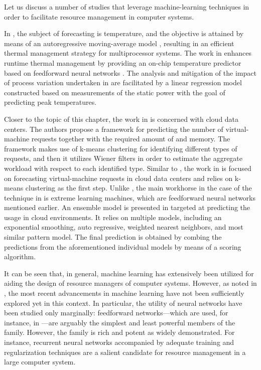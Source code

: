 Let us discuss a number of studies that leverage machine-learning techniques in
order to facilitate resource management in computer systems.

In \cite{coskun2008}, the subject of forecasting is temperature, and the
objective is attained by means of an autoregressive moving-average model
\cite{hastie2013}, resulting in an efficient thermal management strategy for
multiprocessor systems. The work in \cite{kumar2010} enhances runtime thermal
management by providing an on-chip temperature predictor based on feedforward
neural networks \cite{hastie2013}. The analysis and mitigation of the impact of
process variation undertaken in \cite{juan2014} are facilitated by a linear
regression model \cite{hastie2013} constructed based on measurements of the
static power with the goal of predicting peak temperatures.

Closer to the topic of this chapter, the work in \cite{dabbagh2015} is concerned
with cloud data centers. The authors propose a framework for predicting the
number of virtual-machine requests together with the required amount of 
and memory. The framework makes use of k-means clustering \cite{hastie2013} for
identifying different types of requests, and then it utilizes Wiener filters in
order to estimate the aggregate workload with respect to each identified type.
Similar to \cite{dabbagh2015}, the work in \cite{ismaeel2015} is focused on
forecasting virtual-machine requests in cloud data centers and relies on k-means
clustering as the first step. Unlike \cite{dabbagh2015}, the main workhorse in
the case of the technique in \cite{ismaeel2015} is extreme learning machines,
which are feedforward neural networks mentioned earlier. An ensemble model
\cite{hastie2013} is presented in \cite{cao2014} targeted at predicting the
 usage in cloud environments. It relies on multiple models, including an
exponential smoothing, auto regressive, weighted nearest neighbors, and most
similar pattern model. The final prediction is obtained by combing the
predictions from the aforementioned individual models by means of a scoring
algorithm.

It can be seen that, in general, machine learning has extensively been utilized
for aiding the design of resource managers of computer systems. However, as
noted in , the most recent advancements in machine
learning have not been sufficiently explored yet in this context. In particular,
the utility of neural networks have been studied only marginally: feedforward
networks---which are used, for instance, in \cite{kumar2010, ismaeel2015}---are
arguably the simplest and least powerful members of the family. However, the
family is rich and potent as widely demonstrated. For instance, recurrent neural
networks accompanied by adequate training and regularization techniques
\cite{goodfellow2016} are a salient candidate for resource management in a large
computer system.

